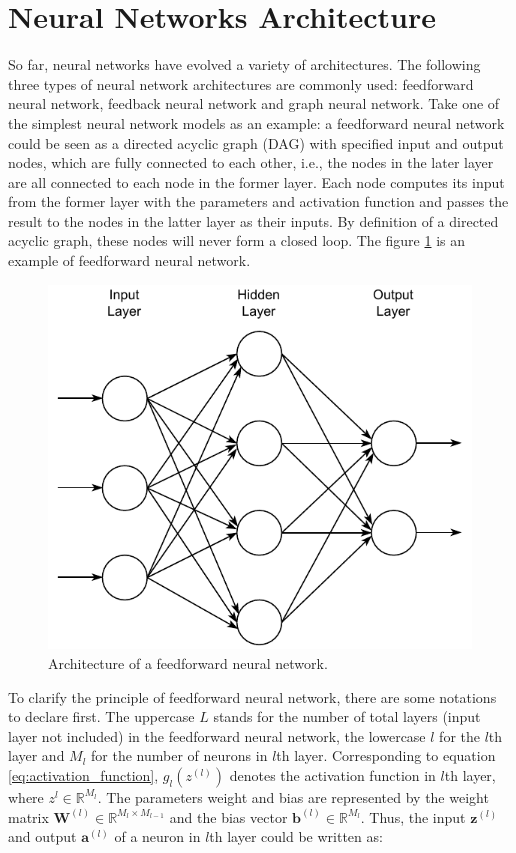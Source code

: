 \documentclass[
	parskip, 			   %
	twoside, 			   %
	DIV=14, 			   %
	BCOR=15.0mm, 		   %
	headsepline, 		   %
	open=right, 		   %
	captions=tableheading, %
	bibliography=totoc,    %
	numbers=noenddot       %
]{scrreprt}
\begin{document}
\section{Neural Networks Architecture}
So far, neural networks have evolved a variety of architectures. The following three types of neural network architectures are commonly used: feedforward neural network, feedback neural network and graph neural network.
Take one of the simplest neural network models as an example: a feedforward neural network could be seen as a directed acyclic graph (DAG) with specified input and output nodes, which are fully connected to each other, i.e., the nodes in the later layer are all connected to each node in the former layer. Each node computes its input from the former layer with the parameters and activation function and passes the result to the nodes in the latter layer as their inputs. By definition of a directed acyclic graph, these nodes will never form a closed loop. The figure \ref{fig:feedforward} is an example of feedforward neural network.

\begin{figure}[h!]
    \centering
    \includegraphics[scale=1]{figures/feedforward_neural_network.pdf}
    \caption{Architecture of a feedforward neural network.}
    \label{fig:feedforward}
\end{figure}

To clarify the principle of feedforward neural network, there are some notations to declare first. The uppercase $L$ stands for the number of total layers (input layer not included) in the feedforward neural network, the lowercase $l$ for the $l$th layer and $M_{l}$ for the number of neurons in $l$th layer. Corresponding to equation \ref{eq:activation_function}, $g_{l}(z^{(l)})$ denotes the activation function in $l$th layer, where $z^{l} \in \mathbb{R}^{M_{l}}$. The parameters weight and bias are represented by the weight matrix $\mathbf{W}^{(l)} \in \mathbb{R}^{M_{l} \times M_{l-1}}$ and the bias vector $\mathbf{b}^{(l)} \in \mathbb{R}^{M_{l}}$. Thus, the input $\mathbf{z}^{(l)}$ and output $\mathbf{a}^{(l)}$ of a neuron in $l$th layer could be written as:
\end{document}
